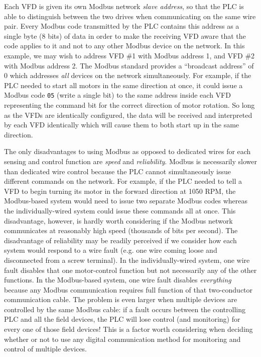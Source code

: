 Each VFD is given its own Modbus network \textit{slave address}, so that the PLC is able to distinguish between the two drives when communicating on the same wire pair.  Every Modbus code transmitted by the PLC contains this address as a single byte (8 bits) of data in order to make the receiving VFD aware that the code applies to it and not to any other Modbus device on the network.  In this example, we may wish to address VFD \#1 with Modbus address 1, and VFD \#2 with Modbus address 2.  The Modbus standard provides a ``broadcast address'' of 0 which addresses \textit{all} devices on the network simultaneously.  For example, if the PLC needed to start all motors in the same direction at once, it could issue a Modbus code \texttt{05} (write a single bit) to the same address inside each VFD representing the command bit for the correct direction of motor rotation.  So long as the VFDs are identically configured, the data will be received and interpreted by each VFD identically which will cause them to both start up in the same direction.

\vskip 10pt

The only disadvantages to using Modbus as opposed to dedicated wires for each sensing and control function are \textit{speed} and \textit{reliability}.  Modbus is necessarily slower than dedicated wire control because the PLC cannot simultaneously issue different commands on the network.  For example, if the PLC needed to tell a VFD to begin turning its motor in the forward direction at 1050 RPM, the Modbus-based system would need to issue two separate Modbus codes whereas the individually-wired system could issue these commands all at once.  This disadvantage, however, is hardly worth considering if the Modbus network communicates at reasonably high speed (thousands of bits per second).  The disadvantage of reliability may be readily perceived if we consider how each system would respond to a wire fault (e.g. one wire coming loose and disconnected from a screw terminal).  In the individually-wired system, one wire fault disables that one motor-control function but not necessarily any of the other functions.  In the Modbus-based system, one wire fault disables \textit{everything} because any Modbus communication requires full function of that two-conductor communication cable.  The problem is even larger when multiple devices are controlled by the same Modbus cable: if a fault occurs between the controlling PLC and all the field devices, the PLC will lose control (and monitoring) for every one of those field devices!  This is a factor worth considering when deciding whether or not to use any digital communication method for monitoring and control of multiple devices.

